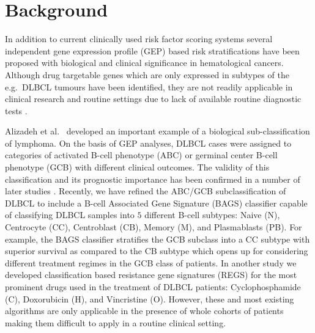 \documentclass[twocolumn]{bmcart}%
\begin{document}




\section{Background}
In addition to current clinically used risk factor scoring systems several independent gene expression profile (GEP) based risk stratifications have been proposed with biological and clinical significance in hematological cancers.
Although drug targetable genes which are only expressed in subtypes of the e.g.\ DLBCL tumours have been identified, they are not readily applicable in clinical research and routine settings due to lack of available routine diagnostic tests \cite{Jaffe2009, Sehn2014}.

Alizadeh et al.~\cite{Alizadeh2000} developed an important example of a biological sub-classification of lymphoma.
On the basis of GEP analyses, DLBCL cases were assigned to categories of activated B-cell phenotype (ABC) or germinal center B-cell phenotype (GCB) with different clinical outcomes.
The validity of this classification and its prognostic importance has been confirmed in a number of later studies \cite{Rosenwald2002a,Hans2004,Poulsen2005,Lenz2008a,Monti2012a}.
Recently, we have refined the ABC/GCB subclassification of DLBCL to include a B-cell Associated Gene Signature (BAGS) classifier \cite{DybkaerBoegsted2015} capable of classifying DLBCL samples into $5$ different B-cell subtypes:
Naive (N), Centrocyte (CC), Centroblast (CB), Memory (M), and Plasmablasts (PB).
For example, the BAGS classifier stratifies the GCB subclass into a CC subtype with superior survival as compared to the CB subtype \cite{DybkaerBoegsted2015} which opens up for considering different treatment regimes in the GCB class of patients.
In another study \cite{Falgreen2015} we developed classification based resistance gene signatures (REGS) for the most prominent drugs used in the treatment of DLBCL patients:
Cyclophosphamide (C), Doxorubicin (H), and Vincristine (O).
However, these and most existing algorithms are only applicable in the presence of whole cohorts of patients making them difficult to apply in a routine clinical setting.
\end{document}
